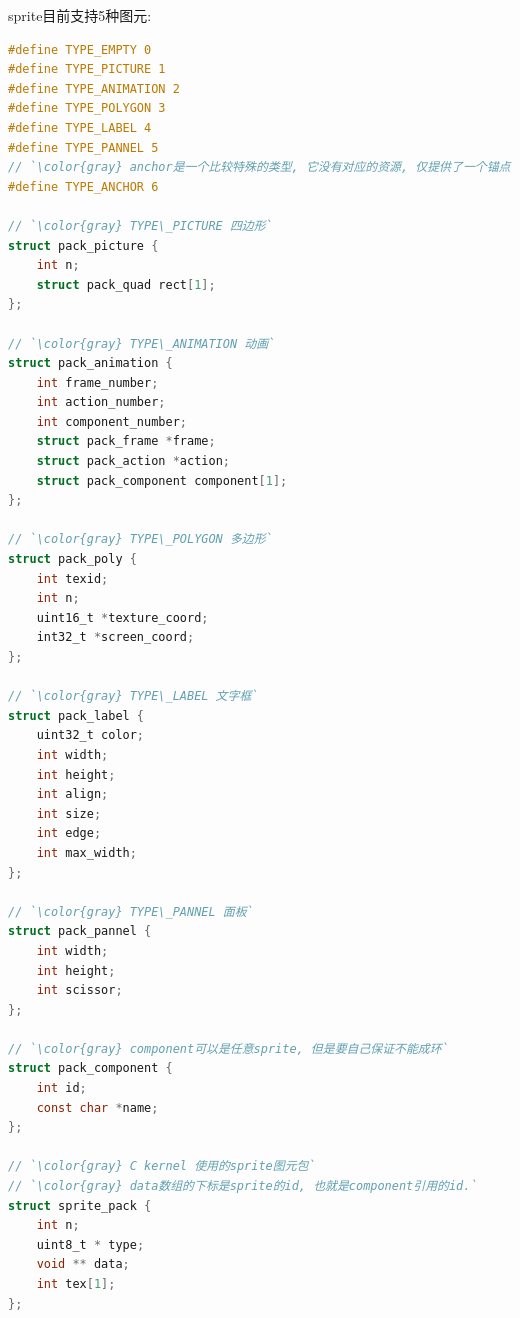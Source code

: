 {sprite目前支持5种图元:}\par
\begin{lstlisting}[language=C]
#define TYPE_EMPTY 0
#define TYPE_PICTURE 1
#define TYPE_ANIMATION 2
#define TYPE_POLYGON 3
#define TYPE_LABEL 4
#define TYPE_PANNEL 5
// `\color{gray} anchor是一个比较特殊的类型, 它没有对应的资源, 仅提供了一个锚点, 可以挂载其他sprite`
#define TYPE_ANCHOR 6

// `\color{gray} TYPE\_PICTURE 四边形`
struct pack_picture {
    int n;
    struct pack_quad rect[1];
};

// `\color{gray} TYPE\_ANIMATION 动画`
struct pack_animation {
    int frame_number;
    int action_number;
    int component_number;
    struct pack_frame *frame;
    struct pack_action *action;
    struct pack_component component[1];
};

// `\color{gray} TYPE\_POLYGON 多边形`
struct pack_poly {
    int texid;
    int n;
    uint16_t *texture_coord;
    int32_t *screen_coord;
};

// `\color{gray} TYPE\_LABEL 文字框`
struct pack_label {
    uint32_t color;
    int width;
    int height;
    int align;
    int size;
    int edge;
    int max_width;
};

// `\color{gray} TYPE\_PANNEL 面板`
struct pack_pannel {
    int width;
    int height;
    int scissor;
};

// `\color{gray} component可以是任意sprite, 但是要自己保证不能成环`
struct pack_component {
    int id;
    const char *name;
};

// `\color{gray} C kernel 使用的sprite图元包`
// `\color{gray} data数组的下标是sprite的id, 也就是component引用的id.`
struct sprite_pack {
    int n;
    uint8_t * type;
    void ** data;
    int tex[1];
};
\end{lstlisting}

